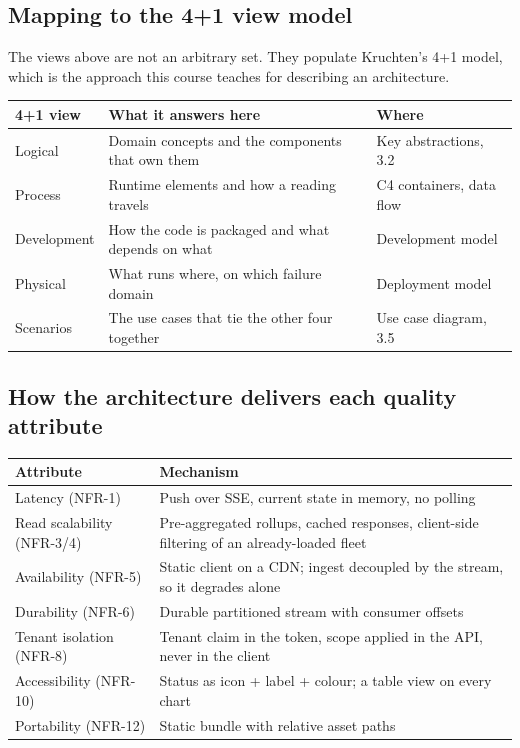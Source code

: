 \documentclass[11pt,a4paper]{article}
\begin{document}
\subsection*{Mapping to the 4+1 view model}

The views above are not an arbitrary set. They populate Kruchten's 4+1 model, which
is the approach this course teaches for describing an architecture.

\begin{center}
\small
\begin{tabularx}{\textwidth}{@{}l X l@{}}
\toprule
\textbf{4+1 view} & \textbf{What it answers here} & \textbf{Where} \\
\midrule
Logical     & Domain concepts and the components that own them & Key abstractions, 3.2 \\
Process     & Runtime elements and how a reading travels & C4 containers, data flow \\
Development & How the code is packaged and what depends on what & Development model \\
Physical    & What runs where, on which failure domain & Deployment model \\
Scenarios   & The use cases that tie the other four together & Use case diagram, 3.5 \\
\bottomrule
\end{tabularx}
\end{center}

\subsection*{How the architecture delivers each quality attribute}

\begin{center}
\small
\begin{tabularx}{\textwidth}{@{}l X@{}}
\toprule
\textbf{Attribute} & \textbf{Mechanism} \\
\midrule
Latency (NFR-1)          & Push over SSE, current state in memory, no polling \\
Read scalability (NFR-3/4) & Pre-aggregated rollups, cached responses, client-side filtering of an already-loaded fleet \\
Availability (NFR-5)     & Static client on a CDN; ingest decoupled by the stream, so it degrades alone \\
Durability (NFR-6)       & Durable partitioned stream with consumer offsets \\
Tenant isolation (NFR-8) & Tenant claim in the token, scope applied in the API, never in the client \\
Accessibility (NFR-10)   & Status as icon + label + colour; a table view on every chart \\
Portability (NFR-12)     & Static bundle with relative asset paths \\
\bottomrule
\end{tabularx}
\end{center}
\end{document}
